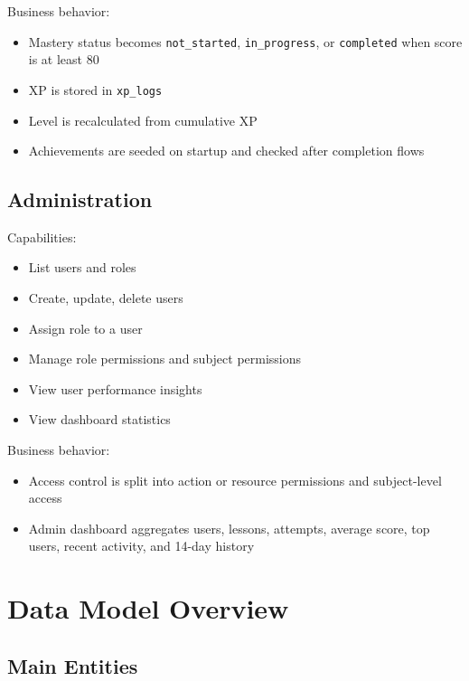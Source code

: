 \documentclass[11pt,a4paper]{article}
\newcommand{\docpath}[1]{\texttt{#1}}
\begin{document}
Business behavior:
\begin{itemize}[leftmargin=1.5em]
  \item Mastery status becomes \docpath{not\_started}, \docpath{in\_progress}, or \docpath{completed} when score is at least 80
  \item XP is stored in \docpath{xp\_logs}
  \item Level is recalculated from cumulative XP
  \item Achievements are seeded on startup and checked after completion flows
\end{itemize}

\subsection{Administration}

Capabilities:
\begin{itemize}[leftmargin=1.5em]
  \item List users and roles
  \item Create, update, delete users
  \item Assign role to a user
  \item Manage role permissions and subject permissions
  \item View user performance insights
  \item View dashboard statistics
\end{itemize}

Business behavior:
\begin{itemize}[leftmargin=1.5em]
  \item Access control is split into action or resource permissions and subject-level access
  \item Admin dashboard aggregates users, lessons, attempts, average score, top users, recent activity, and 14-day history
\end{itemize}

\section{Data Model Overview}

\subsection{Main Entities}
\end{document}
